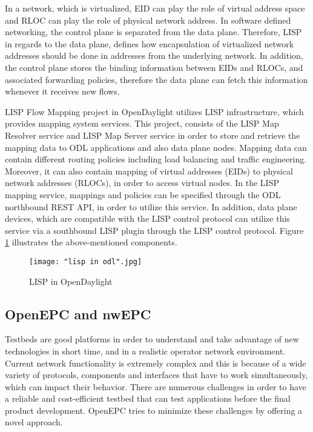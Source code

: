 In a network, which is virtualized, EID can play the role of virtual address space and RLOC can play the role of physical network address. In software defined networking, the control plane is separated from the data plane. Therefore, LISP in regards to the data plane, defines how encapsulation of virtualized network addresses should be done in addresses from the underlying network. In addition, the control plane stores the binding information between EIDs and RLOCs, and associated forwarding policies, therefore the data plane can fetch this information whenever it receives new flows. \cite{ODLLISP}  

LISP Flow Mapping project in OpenDaylight utilizes LISP infrastructure, which provides mapping system services. This project, consists of the LISP Map Resolver service and LISP Map Server service in order to store and retrieve the mapping data to ODL applications and also data plane nodes. Mapping data can contain different routing policies including load balancing and traffic engineering. Moreover, it can also contain mapping of virtual addresses (EIDs) to physical network addresses (RLOCs), in order to access virtual nodes. In the LISP mapping service, mappings and policies can be specified through the ODL northbound REST API, in order to utilize this service. In addition, data plane devices, which are compatible with the LISP control protocol can utilize this service via a southbound LISP plugin through the LISP control protocol. Figure \ref{fig:LispInODL} illustrates the above-mentioned components. 

\begin{figure}[h!t]
\centering
{}
\texttt{[image: "lisp in odl".jpg]}
\caption{LISP in OpenDaylight \cite{ODLLISP}}
\label{fig:LispInODL}
\end{figure}



\subsection{OpenEPC and nwEPC}

Testbeds are good platforms in order to understand and take advantage of new technologies in short time, and in a realistic operator network environment. Current network functionality is extremely complex and this is because of a wide variety of protocols, components and interfaces that have to work simultaneously, which can impact their behavior. There are numerous challenges in order to have a reliable and cost-efficient testbed that can test applications before the final product development. OpenEPC tries to minimize these challenges by offering a novel approach. \cite{OpenEPC}

